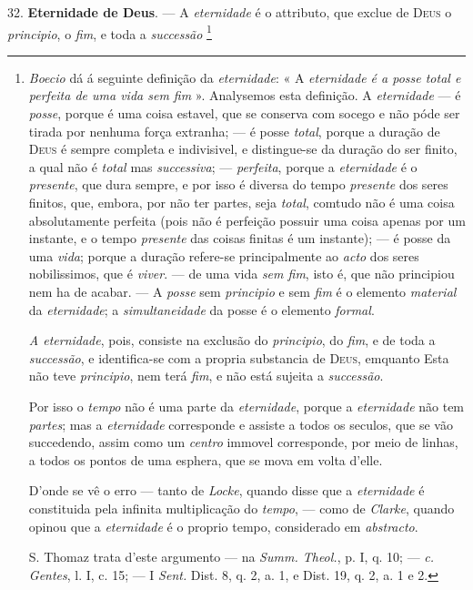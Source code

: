  32. \textbf{Eternidade de Deus}. --- A \emph{eternidade} é o attributo, que exclue de \textsc{Deus} o \emph{principio}, o \emph{fim}, e toda a \emph{successão} \footnote{\emph{Boecio} dá á seguinte definição da \emph{eternidade}: « A \emph{eternidade é a posse total e perfeita de uma vida sem fim} ». Analysemos esta definição. A \emph{eternidade} --- é \emph{posse}, porque é uma coisa estavel, que se conserva com socego e não póde ser tirada por nenhuma força extranha; --- é posse \emph{total}, porque a duração de \textsc{Deus} é sempre completa e indivisivel, e distingue-se da duração do ser finito, a qual não é \emph{total} mas \emph{successiva}; --- \emph{perfeita}, porque a \emph{eternidade} é o \emph{presente}, que dura sempre, e por isso é diversa do tempo \emph{presente} dos seres finitos, que, embora, por não ter partes, seja \emph{total}, comtudo não é uma coisa absolutamente perfeita (pois não é perfeição possuir uma coisa apenas por um instante, e o tempo \emph{presente} das coisas finitas é um instante); --- é posse da uma \emph{vida}; porque a duração refere-se principalmente ao \emph{acto} dos seres nobilissimos, que é \emph{viver}. --- de uma vida \emph{sem fim}, isto é, que não principiou nem ha de acabar. --- A \emph{posse} sem \emph{principio} e sem \emph{fim} é o elemento \emph{material} da \emph{eternidade}; a \emph{simultaneidade} da posse é o elemento \emph{formal}.\par \emph{A eternidade}, pois, consiste na exclusão do \emph{principio}, do \emph{fim}, e de toda a \emph{successão}, e identifica-se com a propria substancia de \textsc{Deus}, emquanto Esta não teve \emph{principio}, nem terá \emph{fim}, e não está sujeita a \emph{successão}.\par Por isso o \emph{tempo} não é uma parte da \emph{eternidade}, porque a \emph{eternidade} não tem \emph{partes}; mas a \emph{eternidade} corresponde e assiste a todos os seculos, que se vão succedendo, assim como um \emph{centro} immovel corresponde, por meio de linhas, a todos os pontos de uma esphera, que se mova em volta d'elle.\par D'onde se vê o erro --- tanto de \emph{Locke}, quando disse que a \emph{eternidade} é constituida pela infinita multiplicação do \emph{tempo}, --- como de \emph{Clarke}, quando opinou que a \emph{eternidade} é o proprio tempo, considerado em \emph{abstracto}.\par S. Thomaz trata d'este argumento --- na \emph{Summ. Theol.}, p. I, q. 10; --- \emph{c. Gentes}, l. I, c. 15; --- I \emph{Sent.} Dist. 8, q. 2, a. 1, e Dist. 19, q. 2, a. 1 e 2.}

